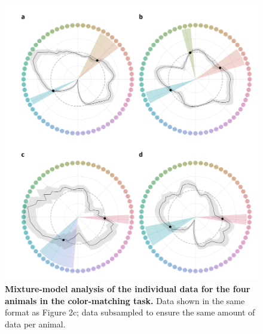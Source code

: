 \begin{figure}
    \centering
    \begin{fullwidth}
    \includegraphics[width=\textwidth+4cm]{../Figures/flat/SI4_MM.jpg}
    \caption{\textbf{Mixture-model analysis of the individual data for the four animals in the color-matching task.}
    Data shown in the same format as Figure 2c; data subsampled to ensure the same amount of data per animal.
    } 
    \label{fig:IndiMM}
    \end{fullwidth}
\end{figure}

